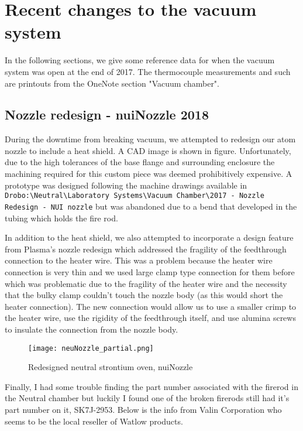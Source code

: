 \chapter{Recent changes to the vacuum system} \label{app:breakingVacuum}
In the following sections, we give some reference data for when the vacuum system was open at the end of 2017.
The thermocouple measurements and such are printouts from the OneNote section "Vacuum chamber".

\section{Nozzle redesign - nuiNozzle 2018}
During the downtime from breaking vacuum, we attempted to redesign our atom nozzle to include a heat shield. A CAD image is shown in figure. Unfortunately, due to the high tolerances of the base flange and surrounding enclosure the machining required for this custom piece was deemed prohibitively expensive. A prototype was designed following the machine drawings available in \texttt{Drobo:\textbackslash Neutral\textbackslash Laboratory Systems\textbackslash Vacuum Chamber\textbackslash 2017 - Nozzle Redesign - NUI nozzle} but was abandoned due to a bend that developed in the tubing which holds the fire rod. 

In addition to the heat shield, we also attempted to incorporate a design feature from Plasma's nozzle redesign which addressed the fragility of the feedthrough connection to the heater wire. 
This was a problem because the heater wire connection is very thin and we used large clamp type connection for them before which was problematic due to the fragility of the heater wire and the necessity that the bulky clamp couldn't touch the nozzle body (as this would short the heater connection). 
The new connection would allow us to use a smaller crimp to the heater wire, use the rigidity of the feedthrough itself, and use alumina screws to insulate the connection from the nozzle body.
	
	\begin{figure} 
		\centerline{
		\texttt{[image: neuNozzle\_partial.png]}}
		\caption{Redesigned neutral strontium oven, nuiNozzle}{}
		\label{fig:nuiNozzle}
	\end{figure}

Finally, I had some trouble finding the part number associated with the firerod in the Neutral chamber but luckily I found one of the broken firerods still had it's part number on it, SK7J-2953. 
Below is the info from Valin Corporation who seems to be the local reseller of Watlow products.

